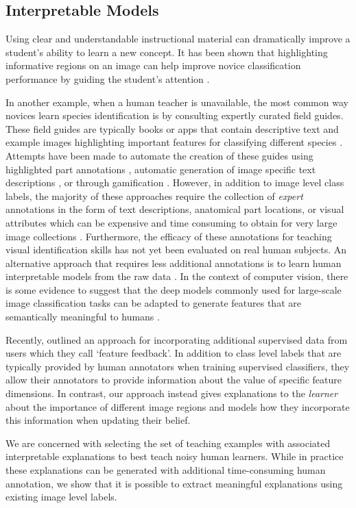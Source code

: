 \documentclass[../main.tex]{subfiles}
\begin{document}
\subsection*{Interpretable Models}
Using clear and understandable instructional material can dramatically improve a student's ability  to learn a new concept.  
It has been shown that highlighting informative regions on an image can help improve novice classification performance by guiding the student's attention \cite{grant2003,roads2016}.

In another example, when a human teacher is unavailable, the most common way novices learn species identification is by consulting expertly curated field guides. 
These field guides are typically books or apps that contain descriptive text and example images highlighting important features for classifying different species \eg \cite{peterson1980field}.
Attempts have been made to automate the creation of these guides using highlighted part annotations \cite{berg2013you}, automatic generation of image specific text descriptions \cite{hendricks2016generating}, or through gamification \cite{deng2016}. 
However, in addition to image level class labels, the majority of these approaches require the collection of \emph{expert} annotations in the form of text descriptions, anatomical part locations, or visual attributes which can be expensive and time consuming to obtain for very large image collections \cite{branson2010}. 
Furthermore, the efficacy of these annotations for teaching visual identification skills has not yet been evaluated on real human subjects. 
An alternative approach that requires less additional annotations is to learn human interpretable models from the raw data \eg \cite{ribeiro2016should, lakkaraju2016interpretable}.
In the context of computer vision, there is some evidence to suggest that the deep models commonly used for large-scale image classification tasks can be adapted to generate features that are semantically meaningful to humans \cite{zhou2016learning, zhang2017interpretable}.

Recently, \cite{pmlr-v54-poulis17a} outlined an approach for incorporating additional supervised data from users which they call `feature feedback'.
In addition to class level labels that are typically provided by human annotators when training supervised classifiers, they allow their annotators to provide information about the value of specific feature dimensions. 
In contrast, our approach instead gives explanations to the \emph{learner} about the importance of different image regions and models how they incorporate this information when updating their belief. 

We are concerned with selecting the set of teaching examples with associated interpretable explanations to best teach noisy human learners. 
While in practice these explanations can be generated with additional time-consuming human annotation, we show that it is possible to extract meaningful explanations using existing image level labels.
\end{document}
